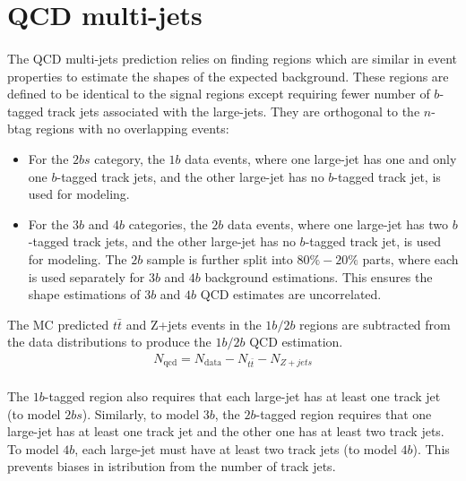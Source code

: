\section{QCD multi-jets}
\label{sec:boosted-qcd}

\paragraph{}
The QCD multi-jets prediction relies on finding regions which are similar in event properties to estimate the shapes of the expected background.
These regions are defined to be identical to the signal regions except requiring fewer number of $b$-tagged track jets associated with the large-\R jets.
They are orthogonal to the $n$-btag regions with no overlapping events:
\begin{itemize}
\item For the $2bs$ category, the $1b$ data events, where one large-\R jet has one and only one $b$-tagged track jets, and the other large-\R jet has no $b$-tagged track jet, is used for modeling.
\item For the $3b$ and $4b$ categories, the $2b$ data events, where one large-\R jet has two $b$-tagged track jets, and the other large-\R jet has no $b$-tagged track jet, is used for modeling. The $2b$ sample is further split into $80\%-20\%$ parts, where each is used separately for $3b$ and $4b$ background estimations. This ensures the shape estimations of $3b$ and $4b$ QCD estimates are uncorrelated. 
\end{itemize}
The MC predicted $t\bar{t}$ and Z+jets events  in the $1b/2b$ regions are subtracted from the data distributions to produce the $1b/2b$ QCD estimation. 
\begin{eqnarray}
N_{\text{qcd}} = N_{\text{data}} - N_{t\bar{t}} - N_{Z+jets} 
\end{eqnarray}

\paragraph{}
The $1b$-tagged region also requires that each large-\R jet has at least one track jet (to model $2bs$).
Similarly, to model $3b$, the $2b$-tagged region requires that one large-\R jet has at least one track jet and the other one has at least two track jets. 
To model $4b$, each large-\R jet must have at least two track jets (to model $4b$).
This prevents biases in \mtwoJ istribution from the number of track jets.

